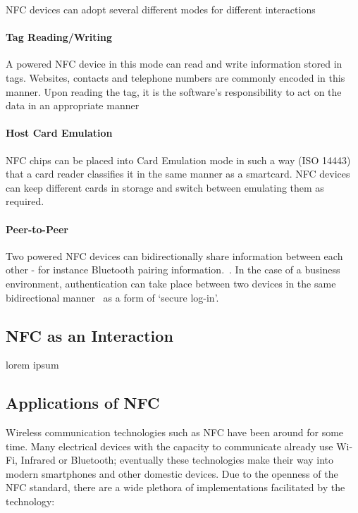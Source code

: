 NFC devices can adopt several different modes for different interactions~\cite{ventata}

\paragraph{Tag Reading/Writing}
A powered NFC device in this mode can read and write information stored in tags. Websites,  contacts and telephone numbers are commonly encoded in this manner. Upon reading the tag, it is the software's responsibility to act on the data in an appropriate manner~\cite{ecosystem}

\paragraph{Host Card Emulation}
NFC chips can be placed into Card Emulation mode in such a way (ISO 14443)~\cite{iso14443} that a card reader classifies it in the same manner as a smartcard. NFC devices can keep different cards in storage and switch between emulating them as required.~\cite{ecosystem}

\paragraph{Peer-to-Peer}
Two powered NFC devices can bidirectionally share information between each other - for instance Bluetooth pairing information.~\cite{ecosystem}. In the case of a business environment, authentication can take place between two devices in the same bidirectional manner~\cite{iso18092} as a form of `secure log-in'.

\subsection{NFC as an Interaction}
lorem ipsum
\clearpage{}
\subsection{Applications of NFC}
Wireless communication technologies such as NFC have been around for some time. Many electrical devices with the capacity to communicate already use Wi-Fi, Infrared or Bluetooth; eventually these technologies make their way into modern smartphones and other domestic devices. Due to the openness of the NFC standard, there are a wide plethora of implementations facilitated by the technology:
